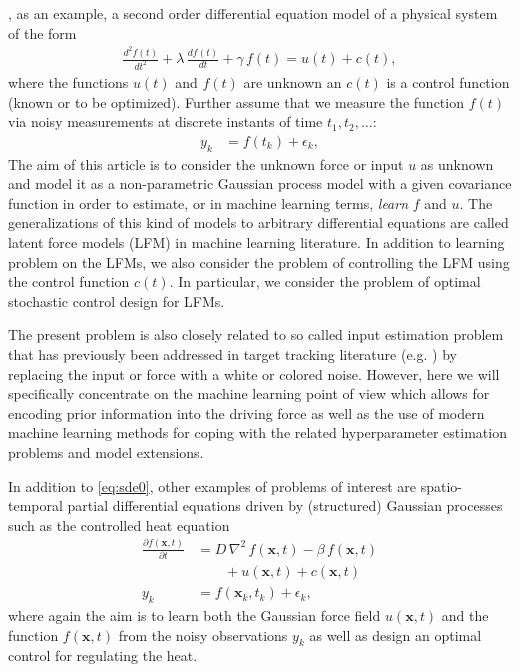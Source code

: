 \documentclass[journal]{IEEEtran}
\begin{document}
, as an example, a second order differential equation model of a physical system of the form
%
\begin{equation}
\begin{split}
  \frac{d^{2}f(t)}{dt^{2}} + \lambda \, \frac{df(t)}{dt} + \gamma \, f(t) = u(t) + c(t),
\end{split}
\label{eq:sde0}
\end{equation}
%
where the functions $u(t)$ and $f(t)$ are unknown an $c(t)$ is a control function (known or to be optimized). Further assume that we measure the function $f(t)$ via noisy measurements at discrete instants of time $t_1,t_2,\ldots$:
%
\begin{equation}
\begin{split}
  y_k &= f(t_k) + \epsilon_k,
\end{split}
\end{equation}
%
The aim of this article is to consider the unknown force or input $u$ as unknown and model it as a non-parametric Gaussian process model \cite{Rasmussen+Williams:2006} with a given covariance function in order to estimate, or in machine learning terms, {\em learn} $f$ and $u$. The generalizations of this kind of models to arbitrary differential equations are called latent force models (LFM) \cite{Alvarez+Luengo+Lawrence:2009,Alvarez:2010,Alvarez+Luengo+Lawrence:2013,Hartikainen+Sarkka:2011,Hartikainen+Seppanen+Sarkka:2012} in machine learning literature. In addition to learning problem on the LFMs, we also consider the problem of controlling the LFM using the control function $c(t)$. In particular, we consider the problem of optimal stochastic control design for LFMs.

The present problem is also closely related to so called input estimation problem that has previously been addressed in target tracking literature (e.g. \cite{Bar-Shalom+Li+Kirubarajan:2001}) by replacing the input or force with a white or colored noise. However, here we will specifically concentrate on the machine learning point of view which allows for encoding prior information into the driving force as well as the use of modern machine learning methods for coping with the related hyperparameter estimation problems and model extensions. 

In addition to \eqref{eq:sde0}, other examples of problems of interest are spatio-temporal partial differential equations driven by (structured) Gaussian processes such as the controlled heat equation
%
\begin{equation}
\begin{split}
  \frac{\partial f(\mathbf{x},t)}{\partial t} &=
  D \, \nabla^2 \, f(\mathbf{x},t) - \beta \, f(\mathbf{x},t) \\
  &\qquad + u(\mathbf{x},t) + c(\mathbf{x},t) \\
  y_k &= f(\mathbf{x}_k,t_k) + \epsilon_k,
\end{split}
\label{eq:spde0}
\end{equation}
%
where again the aim is to learn both the Gaussian force field $u(\mathbf{x},t)$ and the function $f(\mathbf{x},t)$ from the noisy observations $y_k$ as well as design an optimal control for regulating the heat. 
\end{document}
